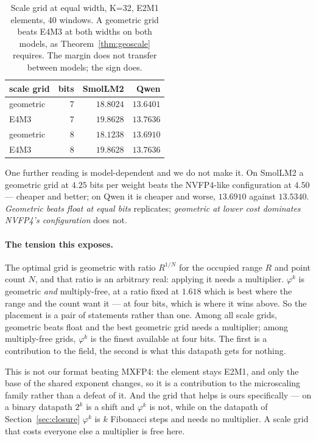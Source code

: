 \documentclass[11pt]{article}
\theoremstyle{definition}
\begin{document}
\begin{table}[t]\centering
\caption{Scale grid at equal width, K=32, E2M1 elements, 40 windows. A
geometric grid beats E4M3 at both widths on both models, as
Theorem~\ref{thm:geoscale} requires. The margin does not transfer between
models; the sign does.}
\label{tab:geoscale}
\begin{tabular}{lrrr}
\toprule
scale grid & bits & SmolLM2 & Qwen \\
\midrule
geometric & 7 & $\mathbf{18.8024}$ & $\mathbf{13.6401}$ \\
E4M3      & 7 & $19.8628$ & $13.7636$ \\
\addlinespace
geometric & 8 & $\mathbf{18.1238}$ & $\mathbf{13.6910}$ \\
E4M3      & 8 & $19.8628$ & $13.7636$ \\
\bottomrule
\end{tabular}
\end{table}

One further reading is model-dependent and we do not make it. On SmolLM2 a
geometric grid at $4.25$ bits per weight beats the NVFP4-like configuration at
$4.50$ --- cheaper and better; on Qwen it is cheaper and worse, $13.6910$
against $13.5340$. \emph{Geometric beats float at equal bits} replicates;
\emph{geometric at lower cost dominates NVFP4's configuration} does not.

\paragraph{The tension this exposes.} The optimal grid is geometric with ratio
$R^{1/N}$ for the occupied range $R$ and point count $N$, and that ratio is an
arbitrary real: applying it needs a multiplier. $\varphi^{k}$ is geometric
\emph{and} multiply-free, at a ratio fixed at $1.618$ which is best where the
range and the count want it --- at four bits, which is where it wins above. So
the placement is a pair of statements rather than one. Among all scale grids,
geometric beats float and the best geometric grid needs a multiplier; among
multiply-free grids, $\varphi^{k}$ is the finest available at four bits. The
first is a contribution to the field, the second is what this datapath gets for
nothing.

This is not our format beating MXFP4: the element stays
E2M1, and only the base of the shared exponent changes, so it is a contribution
to the microscaling family rather than a defeat of it. And the grid that helps
is ours specifically --- on a binary datapath $2^{k}$ is a shift and
$\varphi^{k}$ is not, while on the datapath of Section~\ref{sec:closure}
$\varphi^{k}$ is $k$ Fibonacci steps and needs no multiplier. A scale grid that
costs everyone else a multiplier is free here.
\end{document}
